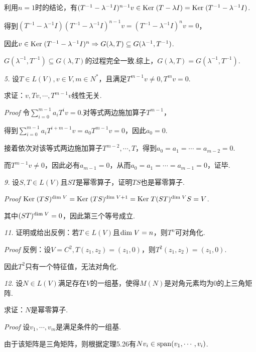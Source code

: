 利用\(n=1\)时的结论，有\((T^{-1}-\lambda^{-1} I)^{n-1}v \in \mathrm{Ker \;} (T-\lambda I)=\mathrm{Ker \;} (T^{-1}-\lambda^{-1} I)\).

得到\((T^{-1}-\lambda^{-1} I)(T^{-1}-\lambda^{-1} I)^{n-1}v=(T^{-1}-\lambda^{-1} I)^n v=0\)，

因此\(v \in \mathrm{Ker \;} (T^{-1}-\lambda^{-1} I)^n \Rightarrow G(\lambda,T) \subseteq G(\lambda^{-1},T^{-1})\).

\(G(\lambda^{-1},T^{-1}) \subseteq G(\lambda,T)\)的过程完全一致.综上，\(G(\lambda,T)=G(\lambda^{-1},T^{-1})\).

\hspace*{\fill}

\textit{5.}
设\(T \in L(V),v \in V,m \in N^*\)，且满足\(T^{m-1}v \ne 0,T^m v=0\).

求证：\(v,Tv,\cdots,T^{m-1}v\)线性无关.

\textit{Proof}
令\(\sum_{i=0}^{m-1} a_iT^i v=0\).对等式两边施加算子\(T^{m-1}\)，

得到\(\sum_{i=0}^{m-1} a_iT^{i+m-1} v=a_0T^{m-1} v=0\)，因此\(a_0=0\).

接着依次对该等式两边施加算子\(T^{m-2},\cdots,T\)，得到\(a_0=a_1=\cdots=a_{m-2}=0\).

而\(T^{m-1}v \ne 0\)，因此必有\(a_{m-1}=0\)，从而\(a_0=a_1=\cdots=a_{m-1}=0\)，证毕.

\hspace*{\fill}

\textit{9.}
设\(S,T \in L(V)\)且\(ST\)是幂零算子，证明\(TS\)也是幂零算子.

\textit{Proof}
\(\mathrm{Ker \;} (TS)^{\mathrm{dim \;} V}=\mathrm{Ker \;} (TS)^{\mathrm{dim \;} V+1}=\mathrm{Ker \;} T(ST)^{\mathrm{dim \;} V}S=V\).

其中\((ST)^{\mathrm{dim \;} V}=0\)，因此第三个等号成立.

\hspace*{\fill}

\textit{11.}
证明或给出反例：若\(T \in L(V)\)且\(\mathrm{dim \;} V=n\)，则\(T^n\)可对角化.

\textit{Proof}
反例：设\(V=C^2,T(z_1,z_2)=(z_1,0)\)，则\(T^2(z_1,z_2)=(z_1,0)\).

因此\(T^2\)只有一个特征值，无法对角化.

\newpage

\textit{12.}
设\(N \in L(V)\)满足存在\(V\)的一组基，使得\(M(N)\)是对角元素均为\(0\)的上三角矩阵.

求证：\(N\)是幂零算子.

\textit{Proof}
设\(v_1,\cdots,v_m\)是满足条件的一组基.

由于该矩阵是三角矩阵，则根据定理5.26有\(Nv_i \in \mathrm{span} (v_1,\cdots,v_i)\).

